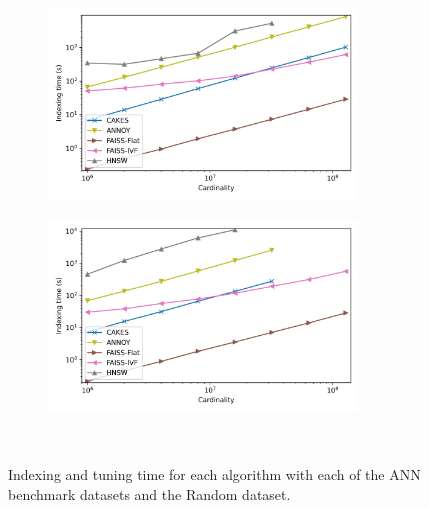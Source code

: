 \documentclass{article}
\begin{document}
\begin{figure}
\begin{subfigure}[b]{0.47\textwidth}
        \label{fig:supplement:glove-25-indexing}
    \end{subfigure}
    \\
    \begin{subfigure}[b]{0.47\textwidth}
        \includegraphics[width=0.9\textwidth]{images/indexing/sift-indexing.png}\\
        \label{fig:supplement:sift-indexing}
    \end{subfigure}%
    \begin{subfigure}[b]{0.47\textwidth}
        \includegraphics[width=0.9\textwidth]{images/indexing/random-indexing.png}\\
        \label{fig:supplement:random-indexing}
    \end{subfigure}%
    \\
    \caption{Indexing and tuning time for each algorithm with each of the ANN benchmark datasets and the Random dataset.}
    \label{fig:supplement:indexing}
\end{figure}
\end{document}
